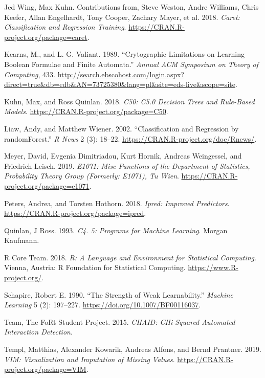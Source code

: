 \documentclass[
]{book}
\theoremstyle{plain}
\theoremstyle{definition}
\theoremstyle{definition}
\theoremstyle{definition}
\theoremstyle{definition}
\theoremstyle{remark}
\begin{document}
\leavevmode\hypertarget{ref-kuhn}{}%
Jed Wing, Max Kuhn. Contributions from, Steve Weston, Andre Williams, Chris Keefer, Allan Engelhardt, Tony Cooper, Zachary Mayer, et al. 2018. \emph{Caret: Classification and Regression Training}. \url{https://CRAN.R-project.org/package=caret}.

\leavevmode\hypertarget{ref-kearns1989}{}%
Kearns, M., and L. G. Valiant. 1989. ``Crytographic Limitations on Learning Boolean Formulae and Finite Automata.'' \emph{Annual ACM Symposium on Theory of Computing}, 433. \url{http://search.ebscohost.com/login.aspx?direct=true\&db=edb\&AN=73725380\&lang=pl\&site=eds-live\&scope=site}.

\leavevmode\hypertarget{ref-R-C50}{}%
Kuhn, Max, and Ross Quinlan. 2018. \emph{C50: C5.0 Decision Trees and Rule-Based Models}. \url{https://CRAN.R-project.org/package=C50}.

\leavevmode\hypertarget{ref-R-las}{}%
Liaw, Andy, and Matthew Wiener. 2002. ``Classification and Regression by randomForest.'' \emph{R News} 2 (3): 18--22. \url{https://CRAN.R-project.org/doc/Rnews/}.

\leavevmode\hypertarget{ref-R-e1071}{}%
Meyer, David, Evgenia Dimitriadou, Kurt Hornik, Andreas Weingessel, and Friedrich Leisch. 2019. \emph{E1071: Misc Functions of the Department of Statistics, Probability Theory Group (Formerly: E1071), Tu Wien}. \url{https://CRAN.R-project.org/package=e1071}.

\leavevmode\hypertarget{ref-R-ipred}{}%
Peters, Andrea, and Torsten Hothorn. 2018. \emph{Ipred: Improved Predictors}. \url{https://CRAN.R-project.org/package=ipred}.

\leavevmode\hypertarget{ref-quinlan1993}{}%
Quinlan, J Ross. 1993. \emph{C4. 5: Programs for Machine Learning}. Morgan Kaufmann.

\leavevmode\hypertarget{ref-R-base}{}%
R Core Team. 2018. \emph{R: A Language and Environment for Statistical Computing}. Vienna, Austria: R Foundation for Statistical Computing. \url{https://www.R-project.org/}.

\leavevmode\hypertarget{ref-schapire1990}{}%
Schapire, Robert E. 1990. ``The Strength of Weak Learnability.'' \emph{Machine Learning} 5 (2): 197--227. \url{https://doi.org/10.1007/BF00116037}.

\leavevmode\hypertarget{ref-R-CHAID}{}%
Team, The FoRt Student Project. 2015. \emph{CHAID: CHi-Squared Automated Interaction Detection}.

\leavevmode\hypertarget{ref-R-VIM}{}%
Templ, Matthias, Alexander Kowarik, Andreas Alfons, and Bernd Prantner. 2019. \emph{VIM: Visualization and Imputation of Missing Values}. \url{https://CRAN.R-project.org/package=VIM}.
\end{document}
